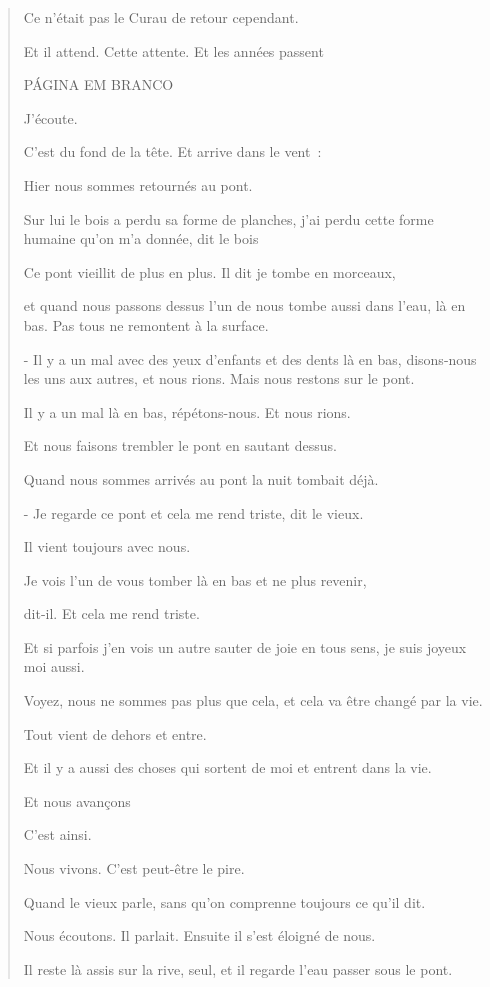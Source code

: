 \begin{quote}
Ce n'était pas le Curau de retour cependant.

Et il attend. Cette attente. Et les années passent

PÁGINA EM BRANCO

J'écoute.

C'est du fond de la tête. Et arrive dans le vent~:

Hier nous sommes retournés au pont.

Sur lui le bois a perdu sa forme de planches, j'ai perdu cette forme
humaine qu'on m'a donnée, dit le bois

Ce pont vieillit de plus en plus. Il dit je tombe en morceaux,

et quand nous passons dessus l'un de nous tombe aussi dans l'eau, là en
bas. Pas tous ne remontent à la surface.

- Il y a un mal avec des yeux d'enfants et des dents là en bas,
disons-nous les uns aux autres, et nous rions. Mais nous restons sur le
pont.

Il y a un mal là en bas, répétons-nous. Et nous rions.

Et nous faisons trembler le pont en sautant dessus.

Quand nous sommes arrivés au pont la nuit tombait déjà.

- Je regarde ce pont et cela me rend triste, dit le vieux.

Il vient toujours avec nous.

Je vois l'un de vous tomber là en bas et ne plus revenir,

dit-il. Et cela me rend triste.

Et si parfois j'en vois un autre sauter de joie en tous sens, je suis
joyeux moi aussi.

Voyez, nous ne sommes pas plus que cela, et cela va être changé par la
vie.

Tout vient de dehors et entre.

Et il y a aussi des choses qui sortent de moi et entrent dans la vie.

Et nous avançons

C'est ainsi.

Nous vivons. C'est peut-être le pire.

Quand le vieux parle, sans qu'on comprenne toujours ce qu'il dit.

Nous écoutons. Il parlait. Ensuite il s'est éloigné de nous.

Il reste là assis sur la rive, seul, et il regarde l'eau passer sous le
pont.


\end{quote}
